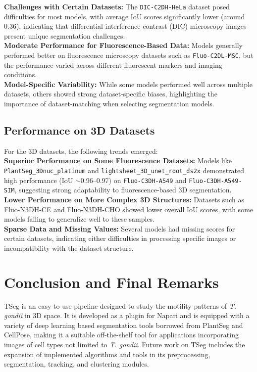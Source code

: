 \documentclass[./dissertation.tex]{subfiles}
\begin{document}
\textbf{Challenges with Certain Datasets:} The \texttt{DIC-C2DH-HeLa} dataset posed difficulties for most models, with average IoU scores significantly lower (around 0.36), indicating that differential interference contrast (DIC) microscopy images present unique segmentation challenges. \\

\textbf{Moderate Performance for Fluorescence-Based Data:} Models generally performed better on fluorescence microscopy datasets such as \texttt{Fluo-C2DL-MSC}, but the performance varied across different fluorescent markers and imaging conditions. \\

\textbf{Model-Specific Variability:} While some models performed well across multiple datasets, others showed strong dataset-specific biases, highlighting the importance of dataset-matching when selecting segmentation models. \\

\subsection{Performance on 3D Datasets \\}

For the 3D datasets, the following trends emerged: \\

\textbf{Superior Performance on Some Fluorescence Datasets:} Models like \texttt{PlantSeg\_3Dnuc\_platinum} and \texttt{lightsheet\_3D\_unet\_root\_ds2x} demonstrated high performance (IoU $\sim$0.96--0.97) on \texttt{Fluo-C3DH-A549} and \texttt{Fluo-C3DH-A549-SIM}, suggesting strong adaptability to fluorescence-based 3D segmentation. \\

\textbf{Lower Performance on More Complex 3D Structures:} Datasets such as Fluo-N3DH-CE and Fluo-N3DH-CHO showed lower overall IoU scores, with some models failing to generalize well to these samples. \\

\textbf{Sparse Data and Missing Values:} Several models had missing scores for certain datasets, indicating either difficulties in processing specific images or incompatibility with the dataset structure. \\


\section{Conclusion and Final Remarks}
TSeg is an easy to use pipeline designed to study the motility patterns of \textit{\textit{T. gondii}} in 3D space. It is developed as a plugin for Napari and is equipped with a variety of deep learning based segmentation tools borrowed from PlantSeg and CellPose, making it a suitable off-the-shelf tool for applications incorporating images of cell types not limited to \textit{\textit{T. gondii}}. Future work on TSeg includes the expansion of implemented algorithms and tools in its preprocessing, segmentation, tracking, and clustering modules.
\end{document}
